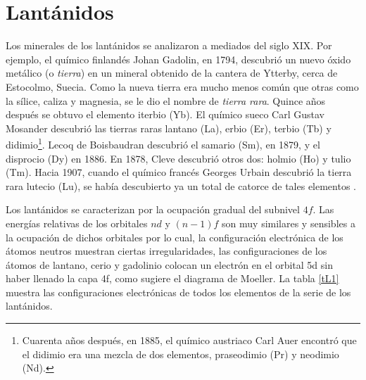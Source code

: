 \section{Lant\'anidos}
Los minerales de los lant\'anidos se analizaron a mediados del siglo
XIX. Por ejemplo, el qu\'imico finland\'es Johan Gadolin, en 1794,
descubri\'o un nuevo \'oxido met\'alico (o {\it tierra}) en un 
mineral obtenido de la cantera de Ytterby, cerca de Estocolmo, 
Suecia. Como la nueva tierra era mucho menos com\'un que otras como 
la s\'ilice, caliza y magnesia, se le dio el nombre de {\it tierra 
rara}. Quince a\~nos despu\'es se obtuvo el elemento iterbio (Yb).
El qu\'imico sueco Carl Gustav Mosander descubri\'o las tierras
raras lantano (La), erbio (Er), terbio (Tb) y didimio\footnote
{Cuarenta a\~nos despu\'es, en 1885, el qu\'imico austriaco 
Carl Auer encontr\'o que el didimio era una mezcla de dos elementos, 
praseodimio (Pr) y neodimio (Nd).}. Lecoq de Boisbaudran descubri\'o 
el samario (Sm), en 1879, y el disprocio (Dy) en 1886. En 1878, Cleve
descubri\'o otros dos: holmio (Ho) y tulio (Tm). Hacia 1907, cuando 
el qu\'imico franc\'es Georges Urbain descubri\'o la tierra rara 
lutecio (Lu), se hab\'ia descubierto ya un total de catorce de tales
elementos \citep{Asim2010}.


Los lant\'anidos se caracterizan por la ocupaci\'on gradual del 
subnivel $4f$. Las energ\'ias relativas de los orbitales $nd$ y
$(n-1)f$ son muy similares y sensibles a la ocupaci\'on de dichos
orbitales por lo cual, la configuraci\'on electr\'onica de los 
\'atomos neutros muestran ciertas irregularidades, las 
configuraciones de los \'atomos de lantano, cerio y gadolinio colocan
un electr\'on en el orbital 5d sin haber llenado la capa 4f, como 
sugiere el diagrama de Moeller. La tabla \ref{tL1} muestra las 
configuraciones electr\'onicas de todos los elementos de la serie de 
los lant\'anidos.

